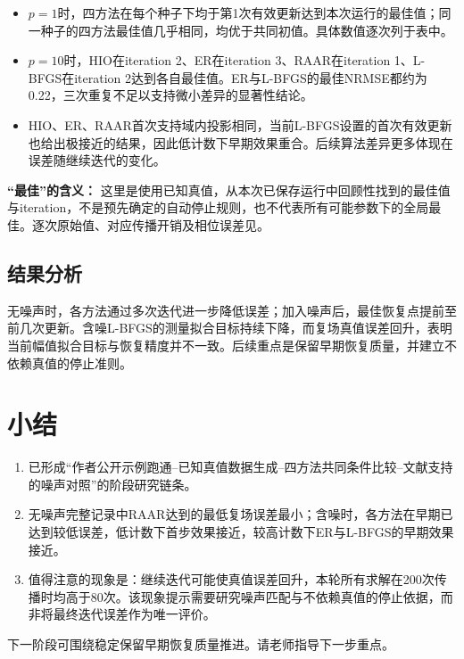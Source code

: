 \documentclass[UTF8,a4paper,11pt,fontset=fandol]{ctexart}
\begin{document}
\begin{itemize}
\item $p=1$时，四方法在每个种子下均于第1次有效更新达到本次运行的最佳值；同一种子的四方法最佳值几乎相同，均优于共同初值。具体数值逐次列于表中。
\item $p=10$时，HIO在iteration 2、ER在iteration 3、RAAR在iteration 1、L-BFGS在iteration 2达到各自最佳值。ER与L-BFGS的最佳NRMSE都约为0.22，三次重复不足以支持微小差异的显著性结论。
\item HIO、ER、RAAR首次支持域内投影相同，当前L-BFGS设置的首次有效更新也给出极接近的结果，因此低计数下早期效果重合。后续算法差异更多体现在误差随继续迭代的变化。
\end{itemize}
\textbf{“最佳”的含义：} 这里是使用已知真值，从本次已保存运行中回顾性找到的最佳值与iteration，不是预先确定的自动停止规则，也不代表所有可能参数下的全局最佳。逐次原始值、对应传播开销及相位误差见。
\subsection*{结果分析}
无噪声时，各方法通过多次迭代进一步降低误差；加入噪声后，最佳恢复点提前至前几次更新。含噪L-BFGS的测量拟合目标持续下降，而复场真值误差回升，表明当前幅值拟合目标与恢复精度并不一致。后续重点是保留早期恢复质量，并建立不依赖真值的停止准则。

\clearpage
\section{小结}
\begin{enumerate}
\item 已形成“作者公开示例跑通--已知真值数据生成--四方法共同条件比较--文献支持的噪声对照”的阶段研究链条。
\item 无噪声完整记录中RAAR达到的最低复场误差最小；含噪时，各方法在早期已达到较低误差，低计数下首步效果接近，较高计数下ER与L-BFGS的早期效果接近。
\item 值得注意的现象是：继续迭代可能使真值误差回升，本轮所有求解在200次传播时均高于80次。该现象提示需要研究噪声匹配与不依赖真值的停止依据，而非将最终迭代误差作为唯一评价。
\end{enumerate}
下一阶段可围绕稳定保留早期恢复质量推进。请老师指导下一步重点。
\end{document}
